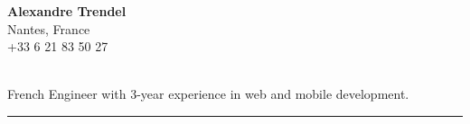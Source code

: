\documentclass{cv}
\begin{document}
\pagestyle{empty}

\noindent\begin{minipage}[t]{0.3\textwidth}

\textbf{\large Alexandre Trendel} \\
Nantes, France \\
 +33 6 21 83 50 27 \\
 \href{mailto:trendel.alexandre@gmail.com}{} \\
 \href{https://github.com/xou816}{}

\end{minipage}
\hfill
\begin{minipage}[t]{0.5\textwidth}

\large

French Engineer with 3-year experience in web and mobile development.

\begin{center}\color{solred}\rule{2cm}{1pt}\end{center}

\end{minipage}

\vspace{1cm}

\end{document}
